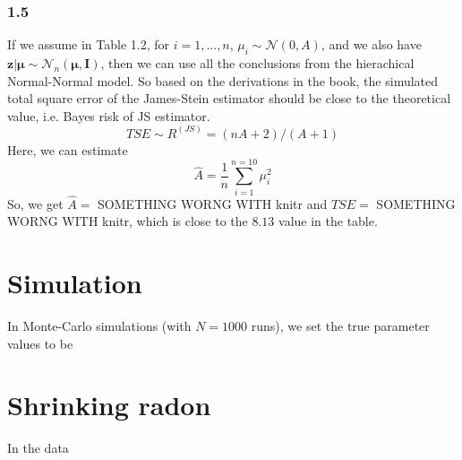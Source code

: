 \documentclass{article}
\newcommand{\rinline}[1]{SOMETHING WORNG WITH knitr}
\begin{document}
\subsubsection*{1.5}
If we assume in Table 1.2, for $i = 1, ..., n$,
$\mu_i \sim \mathcal{N}(0, A)$, and we also have
$\bm{z|\mu} \sim \mathcal{N}_n(\bm{\mu},\bm{I})$, then we can use all the
conclusions from the hierachical Normal-Normal model. \newline
So based on the derivations in the book, the simulated total square
error of the James-Stein estimator should be close to the theoretical 
value, i.e. Bayes risk of JS estimator.
\begin{displaymath}
TSE \sim R^{(JS)} = (nA + 2)/(A+1)
\end{displaymath}
Here, we can estimate
\begin{displaymath}
\hat{A} = \frac{1}{n} \sum_{i=1}^{n=10} \mu_i^2
\end{displaymath}
So, we get $\hat{A}=$ \rinline{A.hat} and $TSE=$ \rinline{TSE}, which is
close to the $8.13$ value in the table.


\newpage
\section*{Simulation}
\hspace{12 pt} In Monte-Carlo simulations (with $N=1000$ runs),
we set the true parameter values to be 




\newpage
\section*{Shrinking radon}
\hspace{12 pt} In the data  
\end{document}
